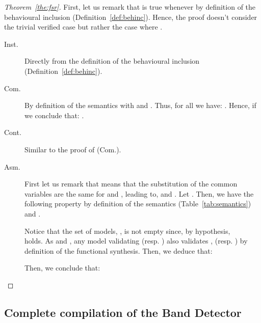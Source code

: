 \documentclass{eptcs}
\newcounter{ti}
\begin{document}
\begin{proof}[Theorem~\ref{the:fsr}]
First, let us remark that  is true whenever  by definition of the behavioural inclusion (Definition~\ref{def:behinc}).
Hence, the proof doesn't consider the trivial verified case but rather the case where .
\begin{description}

\item[Inst.] Directly from the definition of the behavioural inclusion (Definition~\ref{def:behinc}).

\item[Com.] By definition of the semantics  with  and . Thus, for all  we have: . 
Hence, if  we conclude that: .

\item[Cont.] Similar to the proof of (Com.). 

\item[Asm.] First let us remark that  means that the substitution of the common variables are the same for  and , leading to, 
 and . Let . 
Then, we have the following property by definition of the semantics (Table~\ref{tab:semantics}) and .

Notice that the set of models, , is not empty since, by hypothesis,\\  holds.
As  and , any model validating  (resp. ) also validates , (resp. ) by definition of the functional synthesis. Then, we deduce that: 

Then, we conclude that:

\end{description}
\end{proof}
\subsection*{Complete compilation of the Band Detector}
\label{sec:proofEx}
\end{document}
